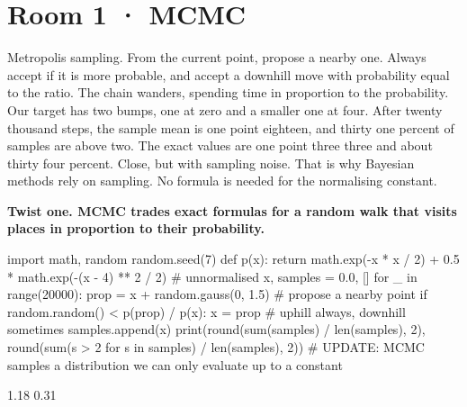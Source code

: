 \documentclass[11pt,a4paper]{report}
\begin{document}
\section*{Room 1 · MCMC}
Metropolis sampling. From the current point, propose a nearby one. Always accept if it is more probable, and accept a downhill move with probability equal to the ratio. The chain wanders, spending time in proportion to the probability. Our target has two bumps, one at zero and a smaller one at four. After twenty thousand steps, the sample mean is one point eighteen, and thirty one percent of samples are above two. The exact values are one point three three and about thirty four percent. Close, but with sampling noise. That is why Bayesian methods rely on sampling. No formula is needed for the normalising constant.
\begin{tcolorbox}[colback=yellow!12,colframe=orange!70!black,boxrule=0.4pt,left=4pt,right=4pt,top=2pt,bottom=2pt]\textbf{Twist one. MCMC trades exact formulas for a random walk that visits places in proportion to their probability.}\end{tcolorbox}
\begin{Code}
import math, random
random.seed(7)
def p(x): return math.exp(-x * x / 2) + 0.5 * math.exp(-(x - 4) ** 2 / 2)   # unnormalised
x, samples = 0.0, []
for _ in range(20000):
    prop = x + random.gauss(0, 1.5)         # propose a nearby point
    if random.random() < p(prop) / p(x): x = prop    # uphill always, downhill sometimes
    samples.append(x)
print(round(sum(samples) / len(samples), 2), round(sum(s > 2 for s in samples) / len(samples), 2))
# UPDATE: MCMC samples a distribution we can only evaluate up to a constant
\end{Code}
\begin{Out}
1.18 0.31
\end{Out}
\end{document}
